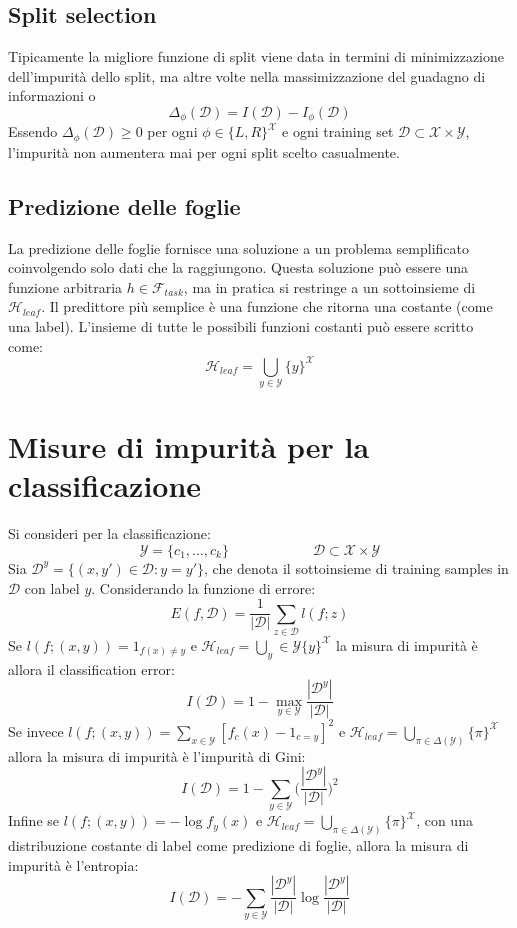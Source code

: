 	\subsection{Split selection}
	Tipicamente la migliore funzione di split viene data in termini di minimizzazione dell'impurit\`a dello split, ma altre volte nella massimizzazione del guadagno di informazioni o
	$$\Delta_\phi(\mathcal{D})=I(\mathcal{D})-I_\phi(\mathcal{D})$$
	Essendo $\Delta_\phi(\mathcal{D})\ge 0$ per ogni $\phi\in\{L,R\}^{\mathcal{X}}$ e ogni training set $\mathcal{D}\subset\mathcal{X}\times\mathcal{Y}$, l'impurit\`a non aumentera mai per ogni split scelto casualmente.

	\subsection{Predizione delle foglie}
	La predizione delle foglie fornisce una soluzione a un problema semplificato coinvolgendo solo dati che la raggiungono.
	Questa soluzione pu\`o essere una funzione arbitraria $h\in\mathcal{F}_{task}$, ma in pratica si restringe a un sottoinsieme di $\mathcal{H}_{leaf}$.
	Il predittore pi\`u semplice \`e una funzione che ritorna una costante (come una label).
	L'insieme di tutte le possibili funzioni costanti pu\`o essere scritto come:
	$$\mathcal{H}_{leaf} = \bigcup\limits_{y\in\mathcal{Y}}\{y\}^{\mathcal{X}}$$

\section{Misure di impurit\`a per la classificazione}
Si consideri per la classificazione:
$$\mathcal{Y} = \{c_1,\dots,c_k\}\qquad\qquad\qquad\mathcal{D}\subset\mathcal{X}\times\mathcal{Y}$$
Sia $\mathcal{D}^y = \{(x, y')\in \mathcal{D}: y = y'\}$, che denota il sottoinsieme di training samples in $\mathcal{D}$ con label $y$.
Considerando la funzione di errore:
$$E(f,\mathcal{D}) = \dfrac{1}{|\mathcal{D}|}\sum\limits_{z\in\mathcal{D}}l(f;z)$$
Se $l(f;(x,y))=1_{f(x)\neq y}$ e $\mathcal{H}_{leaf} = \bigcup\limits_y\in\mathcal{Y}\{y\}^\mathcal{X}$ la misura di impurit\`a \`e allora il classification error:
$$I(\mathcal{D})= 1 -\max\limits_{y\in\mathcal{Y}}\dfrac{|\mathcal{D}^y|}{|\mathcal{D}|}$$
Se invece $l(f;(x,y))=\sum\limits_{x\in\mathcal{Y}}[f_c(x)-1_{c=y}]^2$ e $\mathcal{H}_{leaf}=\bigcup\limits_{\pi\in\Delta(\mathcal{Y})}\{\pi\}^\mathcal{X}$ allora la misura di impurit\`a \`e l'impurit\`a di Gini:
$$I(\mathcal{D}) = 1-\sum\limits_{y\in\mathcal{Y}}\biggl(\dfrac{|\mathcal{D}^y|}{|\mathcal{D}|}\biggr)^2$$
Infine se $l(f;(x,y))=-\log f_y(x)$ e $\mathcal{H}_{leaf} = \bigcup\limits_{\pi\in\Delta(\mathcal{Y})}\{\pi\}^\mathcal{X}$, con una distribuzione costante di label come predizione di foglie, allora la misura di impurit\`a \`e l'entropia:
$$I(\mathcal{D})=-\sum\limits_{y\in\mathcal{Y}}\dfrac{|\mathcal{D}^y|}{|\mathcal{D}|}\log\dfrac{|\mathcal{D}^y|}{|\mathcal{D}|}$$

